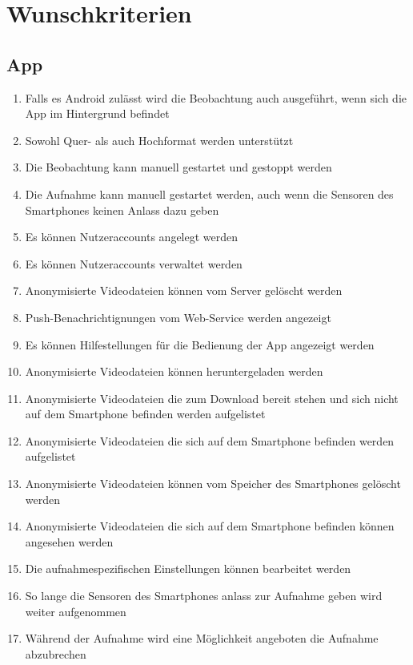 \section{Wunschkriterien}
\subsection{App}
	\begin{enumerate}
	\renewcommand{\labelenumi}{\textbf{\theenumi}}
	\renewcommand{\theenumi}{WK\arabic{enumi}0}
	\setcounter{enumi}{99}
	\item Falls es Android zulässt wird die Beobachtung auch ausgeführt, wenn sich die App im Hintergrund befindet
	\item Sowohl Quer- als auch Hochformat werden unterstützt
	\item Die Beobachtung kann manuell gestartet und gestoppt werden
	\item Die Aufnahme kann manuell gestartet werden, auch wenn die Sensoren des Smartphones keinen Anlass dazu geben
	\item Es können Nutzeraccounts angelegt werden
	\item Es können Nutzeraccounts verwaltet werden
	\item Anonymisierte Videodateien können vom Server gelöscht werden
	\item Push-Benachrichtignungen vom Web-Service werden angezeigt
	\item Es können Hilfestellungen für die Bedienung der App angezeigt werden
	\item Anonymisierte Videodateien können heruntergeladen werden
	\item Anonymisierte Videodateien die zum Download bereit stehen und sich nicht auf dem Smartphone befinden werden aufgelistet
	\item Anonymisierte Videodateien die sich auf dem Smartphone befinden  werden aufgelistet
	\item Anonymisierte Videodateien können vom Speicher des Smartphones gelöscht werden
	\item Anonymisierte Videodateien die sich auf dem Smartphone befinden können angesehen werden
	\item Die aufnahmespezifischen Einstellungen können bearbeitet werden
	\item So lange die Sensoren des Smartphones anlass zur Aufnahme geben wird weiter aufgenommen
	\item Während der Aufnahme wird eine Möglichkeit angeboten die Aufnahme abzubrechen
	\end{enumerate}
